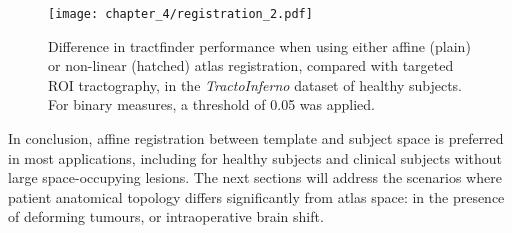 \begin{figure}
  \centering
  \texttt{[image: chapter\_4/registration\_2.pdf]}
  \caption{Difference in tractfinder performance when using either affine (plain) or non-linear (hatched) atlas registration, compared with targeted ROI tractography, in the \textit{TractoInferno} dataset of healthy subjects. For binary measures, a threshold of 0.05 was applied.}
  \label{fig:nrr}
\end{figure}

In conclusion, affine registration between template and subject space is preferred in most applications, including for healthy subjects and clinical subjects without large space-occupying lesions.
The next sections will address the scenarios where patient anatomical topology differs significantly from atlas space: in the presence of deforming tumours, or intraoperative brain shift.
